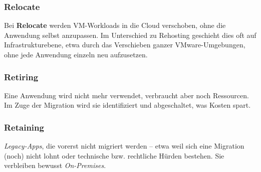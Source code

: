 \subsubsection{Relocate}
Bei \textbf{Relocate} werden VM-Workloads in die Cloud verschoben, ohne die Anwendung selbst anzupassen. Im Unterschied zu Rehosting geschieht dies oft auf Infrastrukturebene, etwa durch das Verschieben ganzer VMware-Umgebungen, ohne jede Anwendung einzeln neu aufzusetzen.

\subsubsection{Retiring}
Eine Anwendung wird nicht mehr verwendet, verbraucht aber noch Ressourcen. Im Zuge der Migration wird sie identifiziert und abgeschaltet, was Kosten spart.

\subsubsection{Retaining}
\emph{Legacy-Apps}, die vorerst nicht migriert werden -- etwa weil sich eine Migration (noch) nicht lohnt oder technische bzw. rechtliche Hürden bestehen. Sie verbleiben bewusst \textit{On-Premises}.
